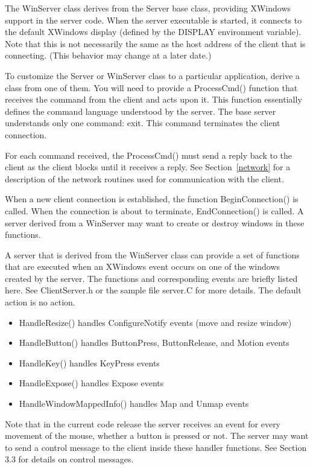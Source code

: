 The WinServer class derives from the Server base class, providing
XWindows support in the server code. When the server executable is
started, it connects to the default XWindows display (defined by the
DISPLAY environment variable). Note that this is not necessarily the
same as the host address of the client that is connecting. (This
behavior may change at a later date.)

To customize the Server or WinServer class to a particular
application, derive a class from one of them. You will need to provide
a ProcessCmd() function that receives the command from the client and
acts upon it. This function essentially defines the command language
understood by the server. The base server understands only one
command: exit. This command terminates the client connection.

For each command received, the ProcessCmd() must send a reply back to
the client as the client blocks until it receives a reply. See
Section~\ref{network} for a description of the network routines used
for communication with the client.

When a new client connection is established, the function
BeginConnection() is called. When the connection is about to
terminate, EndConnection() is called. A server derived from a
WinServer may want to create or destroy windows in these functions.

A server that is derived from the WinServer class can provide a set of
functions that are executed when an XWindows event occurs on one of
the windows created by the server. The functions and corresponding
events are briefly listed here. See ClientServer.h or the sample file
server.C for more details. The default action is no action.

\begin{itemize}
\item
HandleResize() handles ConfigureNotify events (move and resize window)
\item
HandleButton() handles ButtonPress, ButtonRelease, and Motion events
\item
HandleKey() handles KeyPress events
\item
HandleExpose() handles Expose events
\item
HandleWindowMappedInfo() handles Map and Unmap events
\end{itemize}

Note that in the current code release the server receives an event for
every movement of the mouse, whether a button is pressed or not. The
server may want to send a control message to the client inside these
handler functions. See Section 3.3 for details on control messages.

